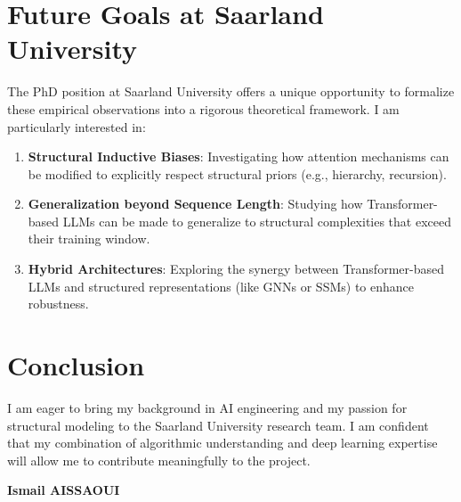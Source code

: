 \documentclass[a4paper,12pt]{article}
\begin{document}
\section*{Future Goals at Saarland University}
The PhD position at Saarland University offers a unique opportunity to formalize these empirical observations into a rigorous theoretical framework. I am particularly interested in:
\begin{enumerate}
    \item \textbf{Structural Inductive Biases}: Investigating how attention mechanisms can be modified to explicitly respect structural priors (e.g., hierarchy, recursion).
    \item \textbf{Generalization beyond Sequence Length}: Studying how Transformer-based LLMs can be made to generalize to structural complexities that exceed their training window.
    \item \textbf{Hybrid Architectures}: Exploring the synergy between Transformer-based LLMs and structured representations (like GNNs or SSMs) to enhance robustness.
\end{enumerate}

\section*{Conclusion}
I am eager to bring my background in AI engineering and my passion for structural modeling to the Saarland University research team. I am confident that my combination of algorithmic understanding and deep learning expertise will allow me to contribute meaningfully to the project.

\bigskip

\begin{flushright}
    \textbf{Ismail AISSAOUI}
\end{flushright}
\end{document}
